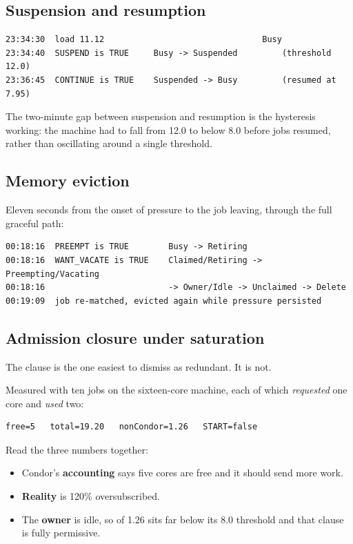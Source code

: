 \subsection{Suspension and resumption}
\label{sec:obs-suspend}

\begin{lstlisting}[style=term]
23:34:30  load 11.12                                Busy
23:34:40  SUSPEND is TRUE     Busy -> Suspended         (threshold 12.0)
23:36:45  CONTINUE is TRUE    Suspended -> Busy         (resumed at 7.95)
\end{lstlisting}

The two-minute gap between suspension and resumption is the hysteresis working:
the machine had to fall from 12.0 to below 8.0 before jobs resumed, rather than
oscillating around a single threshold.

\subsection{Memory eviction}
\label{sec:obs-evict}

Eleven seconds from the onset of pressure to the job leaving, through the full
graceful path:

\begin{lstlisting}[style=term]
00:18:16  PREEMPT is TRUE        Busy -> Retiring
00:18:16  WANT_VACATE is TRUE    Claimed/Retiring -> Preempting/Vacating
00:18:16                         -> Owner/Idle -> Unclaimed -> Delete
00:19:09  job re-matched, evicted again while pressure persisted
\end{lstlisting}

\subsection{Admission closure under saturation}
\label{sec:closure}

The clause  is the one easiest to dismiss as
redundant. It is not.

Measured with ten jobs on the sixteen-core machine, each of which
\emph{requested} one core and \emph{used} two:

\begin{lstlisting}[style=term]
free=5   total=19.20   nonCondor=1.26   START=false
\end{lstlisting}

Read the three numbers together:

\begin{itemize}
  \item Condor's \textbf{accounting} says five cores are free and it should send
        more work.
  \item \textbf{Reality} is 120\% oversubscribed.
  \item The \textbf{owner} is idle, so  of 1.26 sits far below
        its 8.0 threshold and that clause is fully permissive.
\end{itemize}

